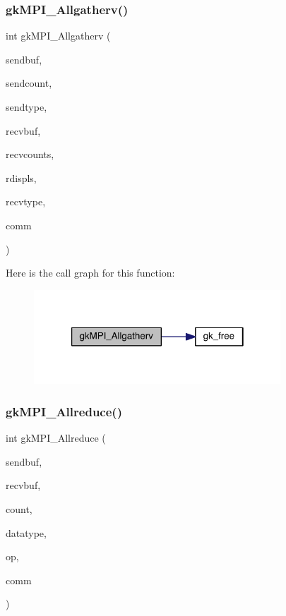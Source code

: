 \subsubsection{\texorpdfstring{gk\+M\+P\+I\+\_\+\+Allgatherv()}{gkMPI\_Allgatherv()}}
{\footnotesize\ttfamily int gk\+M\+P\+I\+\_\+\+Allgatherv (\begin{DoxyParamCaption}\item[{void $\ast$}]{sendbuf,  }\item[{\hyperlink{a00876_aaa5262be3e700770163401acb0150f52}{idx\+\_\+t}}]{sendcount,  }\item[{M\+P\+I\+\_\+\+Datatype}]{sendtype,  }\item[{void $\ast$}]{recvbuf,  }\item[{\hyperlink{a00876_aaa5262be3e700770163401acb0150f52}{idx\+\_\+t} $\ast$}]{recvcounts,  }\item[{\hyperlink{a00876_aaa5262be3e700770163401acb0150f52}{idx\+\_\+t} $\ast$}]{rdispls,  }\item[{M\+P\+I\+\_\+\+Datatype}]{recvtype,  }\item[{M\+P\+I\+\_\+\+Comm}]{comm }\end{DoxyParamCaption})}

Here is the call graph for this function\+:\nopagebreak
\begin{figure}[H]
\begin{center}
\leavevmode
\includegraphics[width=262pt]{a00951_a0b0b0098f344cad26f02c6f825bdde2c_cgraph}
\end{center}
\end{figure}
\mbox{\label{a00951_a192aab5cebcfc29f208341fec3f8fd3a}} 
\subsubsection{\texorpdfstring{gk\+M\+P\+I\+\_\+\+Allreduce()}{gkMPI\_Allreduce()}}
{\footnotesize\ttfamily int gk\+M\+P\+I\+\_\+\+Allreduce (\begin{DoxyParamCaption}\item[{void $\ast$}]{sendbuf,  }\item[{void $\ast$}]{recvbuf,  }\item[{\hyperlink{a00876_aaa5262be3e700770163401acb0150f52}{idx\+\_\+t}}]{count,  }\item[{M\+P\+I\+\_\+\+Datatype}]{datatype,  }\item[{M\+P\+I\+\_\+\+Op}]{op,  }\item[{M\+P\+I\+\_\+\+Comm}]{comm }\end{DoxyParamCaption})}


